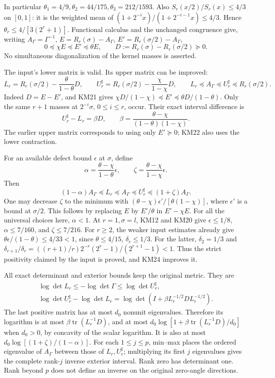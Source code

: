 \documentclass[11pt]{article}
\begin{document}
In particular \(\theta_1=4/9,\theta_2=44/175,\theta_3=212/1593\). Also \(S_r(x/2)/S_r(x)\le4/3\) on \([0,1]\): it is the weighted mean of \((1+2^{-i}x)/(1+2^{-i-1}x)\le4/3\). Hence \(\theta_r\le4/[3(2^r+1)]\). Functional calculus and the unchanged congruence give, writing \(A_\Gamma=\Gamma^{-1}\), \(E=R_r(\sigma)-A_\Gamma\), \(E'=R_r(\sigma/2)-A_\Gamma\), \[
 0\preceq\chi E\preceq E'\preceq\theta E,\qquad
 D:=R_r(\sigma)-R_r(\sigma/2)\succeq0.
 \tag{KM21}
\] No simultaneous diagonalization of the kernel masses is asserted.

The input's lower matrix is valid. Its upper matrix can be improved: \[
 L_r=R_r(\sigma/2)-\frac{\theta}{1-\theta}D,\qquad
 U_r^\sharp=R_r(\sigma/2)-\frac{\chi}{1-\chi}D,
 \qquad L_r\preceq A_\Gamma\preceq U_r^\sharp
 \preceq R_r(\sigma/2).
 \tag{KM22}
\] Indeed \(D=E-E'\), and KM21 gives \(\chi D/(1-\chi)\preceq E'\preceq\theta D/(1-\theta)\). Only the same \(r+1\) masses at \(2^{-i}\sigma\), \(0\le i\le r\), occur. Their exact interval difference is \[
 U_r^\sharp-L_r=\beta D,\qquad
 \beta=\frac{\theta-\chi}{(1-\theta)(1-\chi)}.
 \tag{KM23}
\] The earlier upper matrix corresponds to using only \(E'\succeq0\); KM22 also uses the lower contraction.

For an available defect bound \(\epsilon\) at \(\sigma\), define \[
 \alpha=\frac{\theta-\chi}{1-\theta}\epsilon,\qquad
 \zeta=\frac{\theta-\chi}{1-\chi}\epsilon.
\] Then \[
 (1-\alpha)A_\Gamma\preceq L_r\preceq A_\Gamma
 \preceq U_r^\sharp\preceq(1+\zeta)A_\Gamma.
 \tag{KM24}
\] One may decrease \(\zeta\) to the minimum with \((\theta-\chi)\epsilon' /[\theta(1-\chi)]\), where \(\epsilon'\) is a bound at \(\sigma/2\). This follows by replacing \(E\) by \(E'/\theta\) in \(E'-\chi E\). For all the universal choices here, \(\alpha<1\). At \(r=1,\sigma=l\), KM12 and KM20 give \(\epsilon\le1/8\), \(\alpha\le7/160\), and \(\zeta\le7/216\). For \(r\ge2\), the weaker input estimates already give \(\theta\epsilon/(1-\theta)\le4/33<1\), since \(\theta\le4/15\), \(\delta_r\le1/3\). For the latter, \(\delta_2=1/3\) and \(\delta_{r+1}/\delta_r
=((r+1)/r)2^{-r}(2^r-1)/(2^{r+1}-1)<1\). Thus the strict positivity claimed by the input is proved, and KM24 improves it.

All exact determinant and exterior bounds keep the original metric. They are \[
\begin{gathered}
 \log\det L_r\le-\log\det\Gamma\le\log\det U_r^\sharp,\\
 \log\det U_r^\sharp-\log\det L_r
 =\log\det(I+\beta L_r^{-1/2}DL_r^{-1/2}).
 \end{gathered}
 \tag{KM25}
\] The last positive matrix has at most \(d_0\) nonunit eigenvalues. Therefore its logarithm is at most \(\beta\operatorname{tr}(L_r^{-1}D)\), and at most \(d_0\log[1+\beta\operatorname{tr}(L_r^{-1}D)/d_0]\) when \(d_0>0\), by concavity of the scalar logarithm. It is also at most \(d_0\log[(1+\zeta)/(1-\alpha)]\). For each \(1\le j\le p\), min--max places the ordered eigenvalue of \(A_\Gamma\) between those of \(L_r,U_r^\sharp\); multiplying its first \(j\) eigenvalues gives the complete rank-\(j\) inverse exterior interval. Rank zero has determinant one. Rank beyond \(p\) does not define an inverse on the original zero-angle directions.
\end{document}
